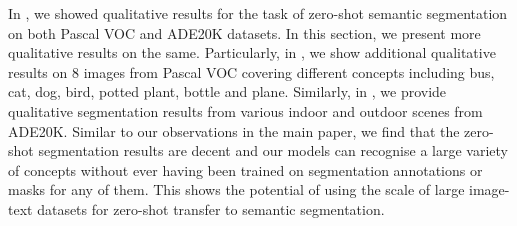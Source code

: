 \documentclass[10pt,twocolumn,letterpaper]{article}
\begin{document}
In , we showed qualitative results for the task of zero-shot semantic segmentation on both Pascal VOC and ADE20K datasets. In this section, we present more qualitative results on the same. Particularly, in , we show additional qualitative results on 8 images from Pascal VOC covering different concepts including bus, cat, dog, bird, potted plant, bottle and plane. Similarly, in , we provide qualitative segmentation results from various indoor and outdoor scenes from ADE20K. Similar to our observations in the main paper, we find that the zero-shot segmentation results are decent and our models can recognise a large variety of concepts without ever having been trained on segmentation annotations or masks for any of them. This shows the potential of using the scale of large image-text datasets for zero-shot transfer to semantic segmentation. 
\end{document}
